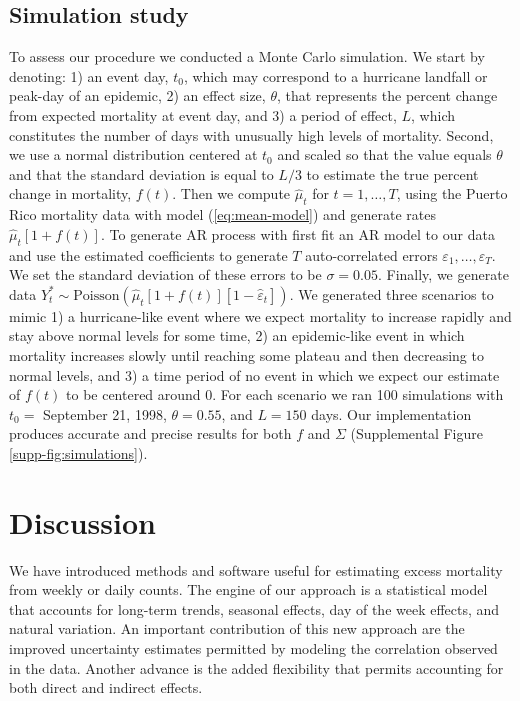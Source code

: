 \documentclass[11pt]{article}
\begin{document}
\subsection{Simulation study}
\label{subsec:simulations}
To assess our procedure we conducted a Monte Carlo simulation. We start by denoting: 1) an event day, $t_0$, which may correspond to a hurricane landfall or peak-day of an epidemic, 2) an effect size, $\theta$, that represents the percent change from expected mortality at event day, and 3) a period of effect, $L$, which constitutes the number of days with unusually high levels of mortality. Second, we use a normal distribution centered at $t_0$ and scaled so that the value equals $\theta$ and that the standard deviation is equal to $L/3$ to estimate the true percent change in mortality, $f(t)$. Then we compute $\hat{\mu}_t$ for $t=1,\ldots, T$, using the Puerto Rico mortality data with model (\ref{eq:mean-model}) and generate rates $\hat{\mu}_t\left[1+f(t)\right]$. To generate AR process with first fit an AR model to our data and use the estimated coefficients to generate $T$ auto-correlated errors $\varepsilon_1, \dots, \varepsilon_T$. We set the standard deviation of these errors to be $\sigma = 0.05$.  Finally, we generate data $Y_t^* \sim \mbox{Poisson}\left(\hat{\mu}_t[1+f(t)][1 - \hat{\varepsilon}_t]\right)$. We generated three scenarios to mimic 1) a hurricane-like event where we expect mortality to increase rapidly and stay above normal levels for some time, 2) an epidemic-like event in which mortality increases slowly until reaching some plateau and then decreasing to normal levels, and 3) a time period of no event in which we expect our estimate of $f(t)$ to be centered around 0. For each scenario we ran 100 simulations with $t_0 = $ September 21, 1998, $\theta = 0.55$, and $L=150$ days. Our implementation produces accurate and precise results for both $f$ and $\Sigma$ (Supplemental Figure \ref{supp-fig:simulations}).

\section{Discussion}
We have introduced methods and software useful for estimating excess mortality from weekly or daily counts. The engine of our approach is a statistical model that accounts for long-term trends, seasonal effects, day of the week effects, and natural variation. An important contribution of this new approach are the improved uncertainty estimates permitted by modeling the correlation observed in the data. Another advance is the added flexibility that permits accounting for both direct and indirect effects. 
\end{document}
